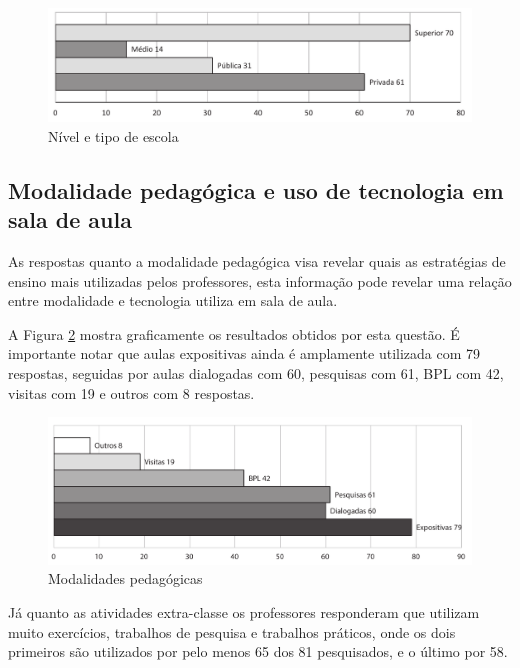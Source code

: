 \begin{figure}[!h]
\centering
\includegraphics[width=1.0\textwidth]{pdfs/professores/img-grafico-nivel.pdf} 
\caption{Nível e tipo de escola}
\label{fig:grafico_nivel} 
\end{figure}


\subsection{Modalidade pedagógica e uso de tecnologia em sala de aula}

As respostas quanto a modalidade pedagógica visa revelar quais as estratégias de ensino mais utilizadas pelos professores, esta informação pode revelar uma relação entre modalidade e tecnologia utiliza em sala de aula.

A Figura \ref{fig:grafico_modalidade} mostra graficamente os resultados obtidos por esta questão. É importante notar que aulas expositivas ainda é amplamente utilizada com 79 respostas, seguidas por aulas dialogadas com 60, pesquisas com 61, BPL com 42, visitas com 19 e outros com 8 respostas.
 
\begin{figure}[!h]
\centering
\includegraphics[width=1.0\textwidth]{pdfs/professores/img-grafico-modalidade.pdf} 
\caption{Modalidades pedagógicas}
\label{fig:grafico_modalidade} 
\end{figure}


Já quanto as atividades extra-classe os professores responderam que utilizam muito exercícios, trabalhos de pesquisa e trabalhos práticos, onde os dois primeiros são utilizados por pelo menos 65 dos 81 pesquisados, e o último por 58. 

